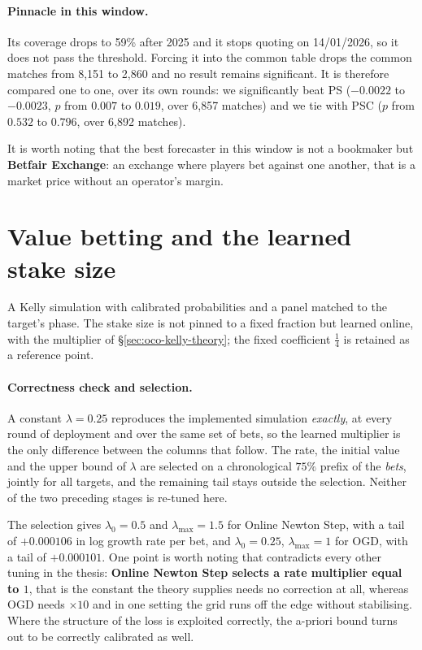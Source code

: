 \documentclass[12pt,a4paper,oneside]{report}
\renewcommand{\_}{\oldunderscore\allowbreak}
\theoremstyle{definition}
\theoremstyle{plain}
\theoremstyle{remark}
\begin{document}
\paragraph{Pinnacle in this window.} Its coverage drops to 59\% after 2025 and it stops quoting on
14/01/2026, so it does not pass the threshold. Forcing it into the common table drops the common
matches from 8,151 to 2,860 and no result remains significant. It is therefore compared one to
one, over its own rounds: we significantly beat PS ($-0.0022$ to $-0.0023$, $p$ from $0.007$ to
$0.019$, over 6,857 matches) and we tie with PSC ($p$ from $0.532$ to $0.796$, over 6,892
matches).

It is worth noting that the best forecaster in this window is not a bookmaker but \textbf{Betfair
Exchange}: an exchange where players bet against one another, that is a market price without an
operator's margin.

\section{Value betting and the learned stake size}
\label{sec:res-value}

A Kelly simulation with calibrated probabilities and a panel matched to the target's phase. The
stake size is not pinned to a fixed fraction but learned online, with the multiplier of
\S\ref{sec:oco-kelly-theory}; the fixed coefficient $\tfrac14$ is retained as a reference point.

\paragraph{Correctness check and selection.} A constant $\lambda = 0.25$ reproduces the
implemented simulation \emph{exactly}, at every round of deployment and over the same set of
bets, so the learned multiplier is the only difference between the columns that follow. The rate,
the initial value and the upper bound of $\lambda$ are selected on a chronological $75\%$ prefix
of the \emph{bets}, jointly for all targets, and the remaining tail stays outside the selection.
Neither of the two preceding stages is re-tuned here.

The selection gives $\lambda_0 = 0.5$ and $\lambda_{\max} = 1.5$ for Online Newton Step, with a
tail of $+0.000106$ in log growth rate per bet, and $\lambda_0 = 0.25$, $\lambda_{\max} = 1$ for
OGD, with a tail of $+0.000101$. One point is worth noting that contradicts every other tuning in
the thesis: \textbf{Online Newton Step selects a rate multiplier equal to $1$}, that is the
constant the theory supplies needs no correction at all, whereas OGD needs $\times 10$ and in one
setting the grid runs off the edge without stabilising. Where the structure of the loss is
exploited correctly, the a-priori bound turns out to be correctly calibrated as well.
\end{document}

